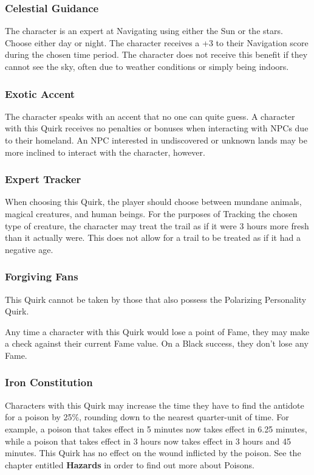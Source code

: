 \documentclass[oneside]{book}
\begin{document}
\begin{multicols}{2}
\subsubsection{Celestial Guidance}
The character is an expert at Navigating using either the Sun or the stars. Choose either day or night. The character receives a +3 to their Navigation score during the chosen time period. The character does not receive this benefit if they cannot see the sky, often due to weather conditions or simply being indoors.

\subsubsection{Exotic Accent}
The character speaks with an accent that no one can quite guess. A character with this Quirk receives no penalties or bonuses when interacting with NPCs due to their homeland. An NPC interested in undiscovered or unknown lands may be more inclined to interact with the character, however. 

\subsubsection{Expert Tracker}
When choosing this Quirk, the player should choose between mundane animals, magical creatures, and human beings. For the purposes of Tracking the chosen type of creature, the character may treat the trail as if it were 3 hours more fresh than it actually were. This does not allow for a trail to be treated as if it had a negative age.

\subsubsection{Forgiving Fans}
This Quirk cannot be taken by those that also possess the Polarizing Personality Quirk.

Any time a character with this Quirk would lose a point of Fame, they may make a check against their current Fame value. On a Black success, they don't lose any Fame. 

\subsubsection{Iron Constitution}
Characters with this Quirk may increase the time they have to find the antidote for a poison by 25\%, rounding down to the nearest quarter-unit of time. For example, a poison that takes effect in 5 minutes now takes effect in 6.25 minutes, while a poison that takes effect in 3 hours now takes effect in 3 hours and 45 minutes. This Quirk has no effect on the wound inflicted by the poison. See the chapter entitled \textbf{Hazards} in order to find out more about Poisons. 


\end{multicols}
\end{document}
